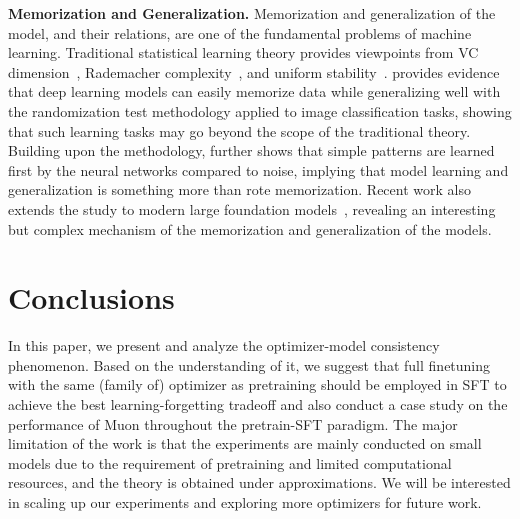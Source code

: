\documentclass{article}
\theoremstyle{remark}
\begin{document}
\textbf{Memorization and Generalization.}
Memorization and generalization of the model, and their relations, are one of the fundamental problems of machine learning. 
Traditional statistical learning theory provides viewpoints from VC dimension~\citep{vapnik1998adaptive}, Rademacher complexity~\citep{bartlett2002rademacher}, and uniform stability~\citep{bousquet2002stability}. 
\citet{zhang2016understanding} provides evidence that deep learning models can easily memorize data while generalizing well with the randomization test methodology applied to image classification tasks, showing that such learning tasks may go beyond the scope of the traditional theory. Building upon the methodology, \citet{arpit2017closer} further shows that simple patterns are learned first by the neural networks compared to noise, implying that model learning and generalization is something more than rote memorization. Recent work also extends the study to modern large foundation models~\citep{carlini2021extracting,carlini2022quantifying,tirumala2022memorization,jagielski2022measuring,schwarzschild2024rethinking,panwar2025better}, revealing an interesting but complex mechanism of the memorization and generalization of the models.





\section{Conclusions}\label{sec:discussion_conclusion}
\vspace{-0.05cm}
In this paper, we present and analyze the optimizer-model consistency phenomenon. Based on the understanding of it, we suggest that full finetuning with the same (family of) optimizer as pretraining should be employed in SFT to achieve the best learning-forgetting tradeoff and also conduct a case study on the performance of Muon throughout the pretrain-SFT paradigm.
The major limitation of the work is that the experiments are mainly conducted on small models due to the requirement of pretraining and limited computational resources, and the theory is obtained under approximations.
We will be interested in scaling up our experiments and exploring more optimizers for future work.
\end{document}
